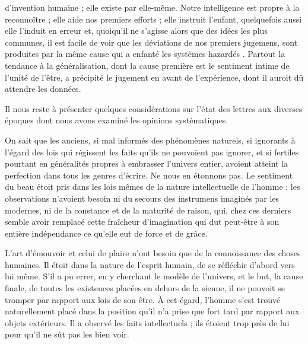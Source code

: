 \documentclass[11pt,a4paper]{article}
\begin{document}
d'invention humaine ; elle existe par elle-même. Notre intelligence est
propre à la reconnoître ; elle aide nos premiers efforts ; elle instruit
l'enfant, quelquefois aussi elle l'induit en erreur et, quoiqu'il ne
s'agisse alors que des idées les plus communes, il est facile de voir que
les déviations de nos premiers jugemens, sont produites par la même cause qui
a enfanté   les systèmes hazardés . Partout la tendance à la généralisation,  dont
la cause première est le sentiment intime de l'unité de l'être, a précipité le
jugement en avant de l'expérience, dont il auroit dû attendre les
 données.

Il nous reste à présenter quelques considérations sur l'état des lettres aux
diverses époques dont nous avons examiné les opinions systématiques.

On sait que les anciens, si mal informés des phénomènes naturels, si
ignorants à l'égard des lois qui régissent les faits qu'ils ne pouvoient pas
ignorer, et si fertiles pourtant en généralités propres à embrasser l'univers
entier, avoient atteint la perfection dans tous les genres d'écrire. Ne nous
en étonnons pas. Le sentiment du beau étoit pris dans  les
lois mêmes de la nature
intellectuelle de l'homme ; les observations n'avoient besoin ni du secours
des instrumens imaginés par les modernes, ni de la constance et de la
maturité de raison, qui, chez  ces derniers semble avoir remplacé
cette fraîcheur d'imagination qui  dut peut-être à son entière
indépendance ce qu'elle eut de force et de grâce.

 L'art d'émouvoir et celui de plaire n'ont
besoin que de la connoissance des choses humaines. Il étoit dans la nature
 de l'esprit humain, de se réfléchir d'abord vers lui
même. S'il a pu errer, en y cherchant le modèle de l'univers, et le but, la
cause finale, de toutes les existences placées en dehors de la sienne, il ne
pouvoit se tromper  par rapport aux lois de son être.
À cet égard, l'homme s'est trouvé naturellement placé dans la position qu'il
n'a prise que fort tard par rapport aux objets extérieurs. Il a observé les
faits intellectuels ; ils étoient trop près de lui pour qu'il ne sût pas les
bien voir.
\end{document}
